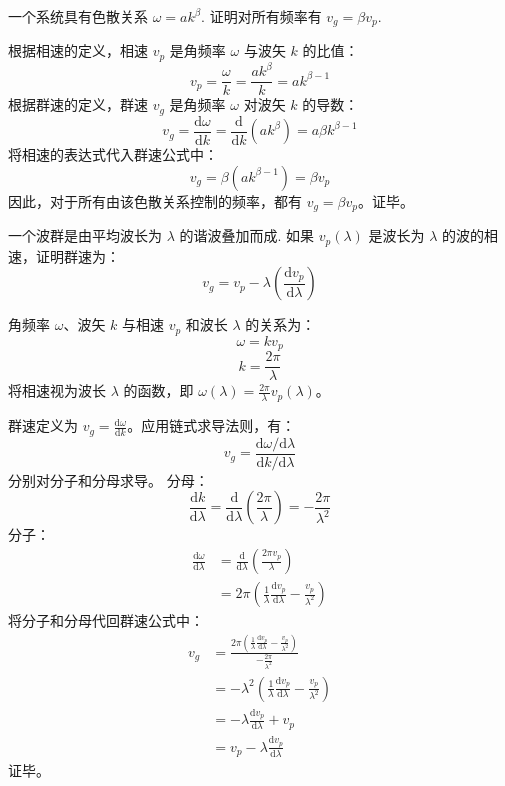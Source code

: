 \begin{exercise}\label{ex:8.6}
一个系统具有色散关系 $\omega = a k^\beta$. 证明对所有频率有 $v_g = \beta v_p$.
\end{exercise}
\begin{solution}
根据相速的定义，相速 $v_p$ 是角频率 $\omega$ 与波矢 $k$ 的比值：
$$ v_p = \frac{\omega}{k} = \frac{a k^\beta}{k} = a k^{\beta - 1} $$
根据群速的定义，群速 $v_g$ 是角频率 $\omega$ 对波矢 $k$ 的导数：
$$ v_g = \frac{\mathrm{d}\omega}{\mathrm{d}k} = \frac{\mathrm{d}}{\mathrm{d}k} \left( a k^\beta \right) = a \beta k^{\beta - 1} $$
将相速的表达式代入群速公式中：
$$ v_g = \beta \left( a k^{\beta - 1} \right) = \beta v_p $$
因此，对于所有由该色散关系控制的频率，都有 $v_g = \beta v_p$。证毕。
\end{solution}

\begin{exercise}\label{ex:8.7}
一个波群是由平均波长为 $\lambda$ 的谐波叠加而成. 如果 $v_p(\lambda)$ 是波长为 $\lambda$ 的波的相速，证明群速为：
$$v_g = v_p - \lambda \left( \frac{\mathrm{d}v_p}{\mathrm{d}\lambda} \right)$$
\end{exercise}
\begin{solution}
角频率 $\omega$、波矢 $k$ 与相速 $v_p$ 和波长 $\lambda$ 的关系为：
$$ \omega = k v_p $$
$$ k = \frac{2\pi}{\lambda} $$
将相速视为波长 $\lambda$ 的函数，即 $\omega(\lambda) = \frac{2\pi}{\lambda} v_p(\lambda)$。

群速定义为 $v_g = \frac{\mathrm{d}\omega}{\mathrm{d}k}$。应用链式求导法则，有：
$$ v_g = \frac{\mathrm{d}\omega / \mathrm{d}\lambda}{\mathrm{d}k / \mathrm{d}\lambda} $$
分别对分子和分母求导。
分母：
$$ \frac{\mathrm{d}k}{\mathrm{d}\lambda} = \frac{\mathrm{d}}{\mathrm{d}\lambda} \left( \frac{2\pi}{\lambda} \right) = -\frac{2\pi}{\lambda^2} $$
分子：
\[
\begin{aligned}
\frac{\mathrm{d}\omega}{\mathrm{d}\lambda} &= \frac{\mathrm{d}}{\mathrm{d}\lambda} \left( \frac{2\pi v_p}{\lambda} \right)\\
  &= 2\pi \left( \frac{1}{\lambda} \frac{\mathrm{d}v_p}{\mathrm{d}\lambda} - \frac{v_p}{\lambda^2} \right)
\end{aligned}
\]
将分子和分母代回群速公式中：
\begin{align*}
    v_g &= \frac{2\pi \left( \frac{1}{\lambda} \frac{\mathrm{d}v_p}{\mathrm{d}\lambda} - \frac{v_p}{\lambda^2} \right)}{-\frac{2\pi}{\lambda^2}} \\
        &= -\lambda^2 \left( \frac{1}{\lambda} \frac{\mathrm{d}v_p}{\mathrm{d}\lambda} - \frac{v_p}{\lambda^2} \right) \\
        &= -\lambda \frac{\mathrm{d}v_p}{\mathrm{d}\lambda} + v_p \\
        &= v_p - \lambda \frac{\mathrm{d}v_p}{\mathrm{d}\lambda}
\end{align*}
证毕。
\end{solution}

